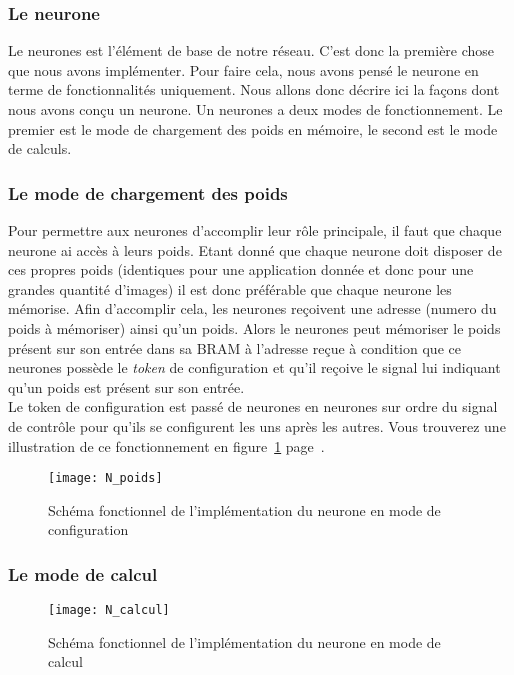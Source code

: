 \subsubsection{Le neurone}
	Le neurones est l'élément de base de notre réseau.
	C'est donc la première chose que nous avons implémenter.
	Pour faire cela, nous avons pensé le neurone en terme de
	fonctionnalités uniquement.
	Nous allons donc décrire ici la façons dont nous avons conçu un neurone. 
	Un neurones a deux modes de fonctionnement.
	Le premier est le mode de chargement des poids en mémoire, le second
	est le mode de calculs.

	\subsubsection{Le mode de chargement des poids}
	Pour permettre aux neurones d'accomplir leur rôle principale, il faut que chaque neurone ai
	accès à leurs poids. Etant donné que chaque neurone doit disposer de ces propres poids
	(identiques pour une application donnée et donc pour une grandes quantité d'images)
	il est donc préférable que chaque neurone les mémorise. Afin d'accomplir cela,
	les neurones reçoivent une adresse (numero du poids à mémoriser) ainsi qu'un poids.
	Alors le neurones peut mémoriser le poids présent sur son entrée dans
	sa BRAM à l'adresse reçue à condition que ce neurones possède le {\em token} de
	configuration et qu'il reçoive le signal lui indiquant qu'un poids est présent sur son entrée.\\
	Le token de configuration est passé de neurones en neurones
	sur ordre du signal de contrôle pour qu'ils se configurent les uns après les autres.
	Vous trouverez une illustration de ce fonctionnement en
	figure~\ref{fig:N_poids} page~\pageref{fig:N_poids}.
	\begin{figure}[h!]
		\begin{center}
			\texttt{[image: N\_poids]}
			\caption{Schéma fonctionnel de l'implémentation du neurone en mode de configuration}
			\label{fig:N_poids}
		\end{center}
	\end{figure}

	\subsubsection{Le mode de calcul}
	\begin{figure}[h!]
		\begin{center}
			\texttt{[image: N\_calcul]}
			\caption{Schéma fonctionnel de l'implémentation du neurone en mode de calcul}
			\label{fig:N_calcul}
		\end{center}
	\end{figure}
	
